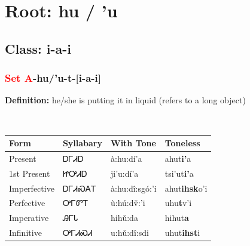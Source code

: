 \needspace{4in}
\section*{Root: hu / 'u}
\nopagebreak
{}
\needspace{3in}
\subsection*{Class: i-a-i}
\nopagebreak
\needspace{2in}
\subsubsection*{\textcolor{Red}{Set A}{-}\textbf{hu/'u}{-}t{-}[i-a-i]}
\nopagebreak
\textbf{Definition: } he/she is putting it in liquid (refers to a long object)
\\[0.5em]
\begin{tabularx}{\textwidth}{l X X X}%
\toprule%
\textbf{Form}&\textbf{Syllabary}&\textbf{With Tone}&\textbf{Toneless}\\%
\midrule%
Present&ᎠᎱᏗᎠ&à:hu:dí’a&ahut\textbf{i'}a\\%
1st Present&ᏥᎤᏗᎠ&ji’u:dí’a&tsi'ut\textbf{i'}a\\%
Imperfective&ᎠᎱᏗᏍᎪᎢ&à:hu:dî:sgó:’i&ahut\textbf{ihsk}o'i\\%
Perfective&ᎤᎱᏛᎢ&ù:hú:dv̌:’i&uhu\textbf{t}v'i\\%
Imperative&ᎯᎱᏓ&hihǔ:da&hihut\textbf{a}\\%
Infinitive&ᎤᎱᏗᏍᏗ&u:hǔ:dî:sdi&uhut\textbf{ihst}i\\%
\bottomrule%
\end{tabularx}
\\[1em]